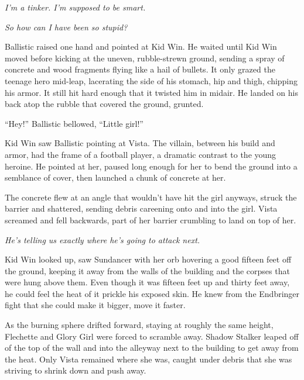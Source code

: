 \emph{I'm a tinker.  I'm supposed to be smart.}



\emph{So how can I have been so stupid?}



Ballistic raised one hand and pointed at Kid Win.  He waited until Kid Win moved before kicking at the uneven, rubble-strewn ground, sending a spray of concrete and wood fragments flying like a hail of bullets.  It only grazed the teenage hero mid-leap, lacerating the side of his stomach, hip and thigh, chipping his armor.  It still hit hard enough that it twisted him in midair.  He landed on his back atop the rubble that covered the ground, grunted.



``Hey!'' Ballistic bellowed, ``Little girl!''



Kid Win saw Ballistic pointing at Vista.  The villain, between his build and armor, had the frame of a football player, a dramatic contrast to the young heroine.  He pointed at her, paused long enough for her to bend the ground into a semblance of cover, then launched a chunk of concrete at her.



The concrete flew at an angle that wouldn't have hit the girl anyways, struck the barrier and shattered, sending debris careening onto and into the girl.  Vista screamed and fell backwards, part of her barrier crumbling to land on top of her.



\emph{He's telling us exactly where he's going to attack next.}



Kid Win looked up, saw Sundancer with her orb hovering a good fifteen feet off the ground, keeping it away from the walls of the building and the corpses that were hung above them.  Even though it was fifteen feet up and thirty feet away, he could feel the heat of it prickle his exposed skin.  He knew from the Endbringer fight that she could make it bigger, move it faster.



As the burning sphere drifted forward, staying at roughly the same height, Flechette and Glory Girl were forced to scramble away.  Shadow Stalker leaped off of the top of the wall and into the alleyway next to the building to get away from the heat.  Only Vista remained where she was, caught under debris that she was striving to shrink down and push away.



